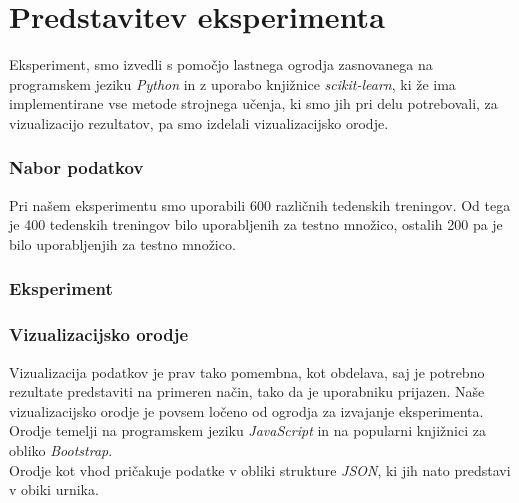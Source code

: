 \documentclass{acm_proc_article-sp}
\begin{document}
\section{Predstavitev eksperimenta}
Eksperiment, smo izvedli s pomočjo lastnega ogrodja zasnovanega na programskem jeziku \textit{Python} in z uporabo knjižnice \textit{scikit-learn}, ki že ima implementirane vse metode strojnega učenja, ki smo jih pri delu potrebovali, za vizualizacijo rezultatov, pa smo izdelali vizualizacijsko orodje. 


\subsubsection{Nabor podatkov}
Pri našem eksperimentu smo uporabili 600 različnih tedenskih treningov.
Od tega je 400 tedenskih treningov bilo uporabljenih za testno množico, ostalih 200 pa je bilo uporabljenjih za testno množico.

\subsubsection{Eksperiment}

\subsubsection{Vizualizacijsko orodje}
Vizualizacija podatkov je prav tako pomembna, kot obdelava, saj je potrebno rezultate predstaviti na primeren način, tako da je uporabniku prijazen. Naše vizualizacijsko orodje je povsem ločeno od ogrodja za izvajanje eksperimenta. Orodje temelji na programskem jeziku \textit{JavaScript} in na popularni knjižnici za obliko \textit{Bootstrap}.\\
Orodje kot vhod pričakuje podatke v obliki strukture \textit{JSON}, ki jih nato predstavi v obiki urnika.\\ 
\end{document}
